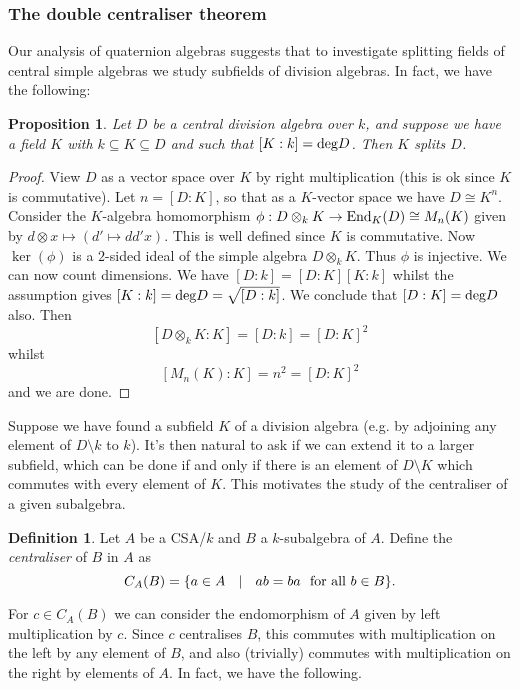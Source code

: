 \documentclass[11pt]{amsart}
\numberwithin{equation}{section}
\newtheorem{proposition}[equation]{Proposition}
\theoremstyle{remark}
\theoremstyle{remark}
\theoremstyle{remark}
\theoremstyle{definition}
\theoremstyle{definition}
\theoremstyle{definition}
\newtheorem{defi}[equation]{Definition}
\theoremstyle{definition}
\theoremstyle{definition}
\theoremstyle{definition}
\begin{document}
\subsubsection{The double centraliser theorem}

Our analysis of quaternion algebras suggests that to investigate splitting fields of central simple algebras we study subfields of division algebras. In fact, we have the following:

\begin{proposition} \label{splitting criterion}
Let $D$ be a central division algebra over $k$, and suppose we have a field $K$ with $k\subseteq K\subseteq D$ and such that $[K:k]=\textup{deg}D$. Then $K$ splits $D$.
\end{proposition}

\begin{proof}
View $D$ as a vector space over $K$ by right multiplication (this is ok since $K$ is commutative). Let $n=[D:K]$, so that as a $K$-vector space we have $D\cong K^n$. Consider the $K$-algebra homomorphism $\phi:D\otimes_k K \rightarrow \textup{End}_K(D)\cong M_n(K)$ given by $d\otimes x \mapsto (d'\mapsto dd'x)$. This is well defined since $K$ is commutative. Now $\ker(\phi)$ is a $2$-sided ideal of the simple algebra $D\otimes_k K$. Thus $\phi$ is injective. We can now count dimensions. We have $[D:k]=[D:K][K:k]$ whilst the assumption gives $[K:k]=\textup{deg}D=\sqrt{[D:k]}$. We conclude that $[D:K]=\textup{deg}D$ also. Then
\[[D\otimes_k K:K]=[D:k]=[D:K]^2\]
whilst 
\[[M_n(K):K]=n^2=[D:K]^2\]
and we are done.
\end{proof}

Suppose we have found a subfield $K$ of a division algebra (e.g. by adjoining any element of $D\setminus k$ to $k$). It's then natural to ask if we can extend it to a larger subfield, which can be done if and only if there is an element of $D\setminus K$ which commutes with every element of $K$. This motivates the study of the centraliser of a given subalgebra.

\begin{defi}
Let $A$ be a CSA/$k$ and $B$ a $k$-subalgebra of $A$. Define the \textit{centraliser} of $B$ in $A$ as
\[C_A(B)=\{a\in A~~\mid~~ab=ba~~\textup{for all }b\in B\}.\]
\end{defi}

For $c\in C_A(B)$ we can consider the endomorphism of $A$ given by left multiplication by $c$. Since $c$ centralises $B$, this commutes with multiplication on the left by any element of $B$, and also (trivially) commutes with multiplication on the right by elements of $A$. In fact, we have the following. 
\end{document}
